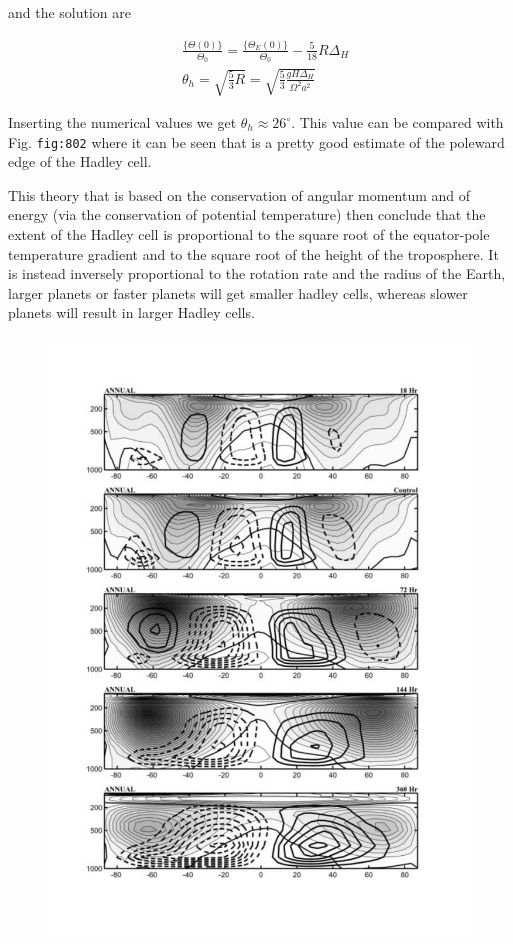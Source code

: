 and the solution are

\[
\begin{aligned}
&\frac{\{ \Theta(0)\} }{\Theta_0} = \frac{\{ \Theta_E(0)\} }{\Theta_0} -\frac{5}{18} R \Delta_H\\
&\theta_h = \sqrt{\frac{5}{3} R} =\sqrt{\frac{5}{3} \frac{gH\Delta_H}{\Omega^2 a^2}}
\end{aligned}
\]

Inserting the numerical values we get \(\theta_h \approx 26^\circ\).
This value can be compared with Fig. \texttt{fig:802} where it can be
seen that is a pretty good estimate of the poleward edge of the Hadley
cell.

This theory that is based on the conservation of angular momentum and of
energy (via the conservation of potential temperature) then conclude
that the extent of the Hadley cell is proportional to the square root of
the equator-pole temperature gradient and to the square root of the
height of the troposphere. It is instead inversely proportional to the
rotation rate and the radius of the Earth, larger planets or faster
planets will get smaller hadley cells, whereas slower planets will
result in larger Hadley cells.

\begin{figure}
\centering
\includegraphics[width = .7 \textwidth]{figs/GD/Rot1.png}
\caption{}
\label{fig:}
\end{figure}

